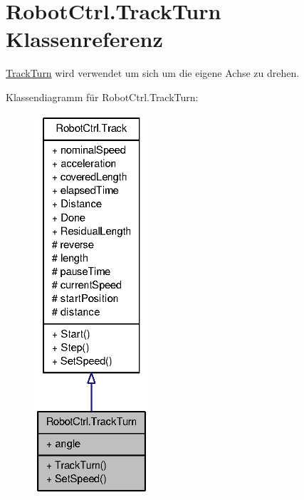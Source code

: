 \hypertarget{class_robot_ctrl_1_1_track_turn}{
\section{RobotCtrl.TrackTurn Klassenreferenz}
\label{class_robot_ctrl_1_1_track_turn}
}


\hyperlink{class_robot_ctrl_1_1_track_turn}{TrackTurn} wird verwendet um sich um die eigene Achse zu drehen.  




Klassendiagramm für RobotCtrl.TrackTurn:\nopagebreak
\begin{figure}[H]
\begin{center}
\leavevmode
\includegraphics[height=400pt]{class_robot_ctrl_1_1_track_turn__inherit__graph}
\end{center}
\end{figure}


